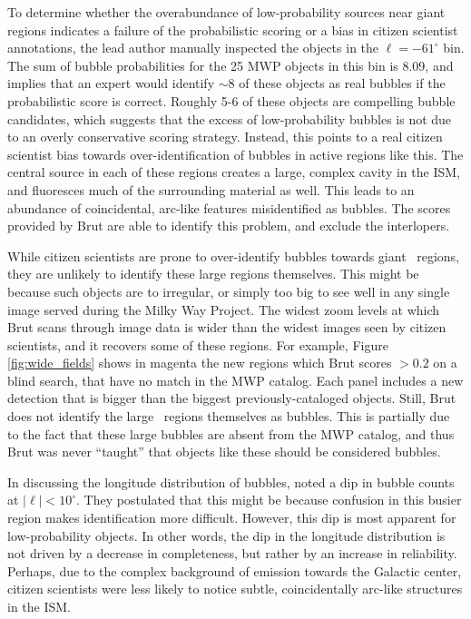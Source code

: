 To determine whether the overabundance of low-probability sources near giant \hii\, regions indicates a failure of the probabilistic scoring or a bias in citizen scientist annotations, the lead author manually inspected the objects in the $\ell=-61^\circ$ bin. The sum of bubble probabilities for the 25 MWP objects in this bin is 8.09, and implies that an expert would identify $\sim 8$ of these objects as real bubbles if the probabilistic score is correct. Roughly 5-6 of these objects are compelling bubble candidates, which suggests that the excess of low-probability bubbles is not due to an overly conservative scoring strategy. Instead, this points to a real citizen scientist bias towards over-identification of bubbles in active regions like this. The central source in each of these regions creates a large, complex cavity in the ISM, and fluoresces much of the surrounding material as well. This leads to an abundance of coincidental, arc-like features misidentified as bubbles. The scores provided by Brut are able to identify this problem, and exclude the interlopers.

While citizen scientists are prone to over-identify bubbles towards giant \hii\, regions, they are unlikely to identify these large regions themselves. This might be because such objects are to irregular, or simply too big to see well in any single image served during the Milky Way Project. The widest zoom levels at which Brut scans through image data is wider than the widest images seen by citizen scientists, and it recovers some of these regions. For example, Figure \ref{fig:wide_fields} shows in magenta the new regions which Brut scores $>0.2$ on a blind search, that have no match in the MWP catalog. Each panel includes a new detection that is bigger than the biggest previously-cataloged objects. Still, Brut does not identify the large \hii\, regions themselves as bubbles. This is partially due to the fact that these large bubbles are absent from the MWP catalog, and thus Brut was never ``taught'' that objects like these should be considered bubbles.

In discussing the longitude distribution of bubbles, \cite{Simpson12} noted a dip in bubble counts at $|\ell| < 10^\circ$. They postulated that this might be because confusion in this busier region makes identification more difficult. However, this dip is most apparent for low-probability objects. In other words, the dip in the longitude distribution is not driven by a decrease in completeness, but rather by an increase in reliability. Perhaps, due to the complex background of emission towards the Galactic center, citizen scientists were less likely to notice subtle, coincidentally arc-like structures in the ISM.


